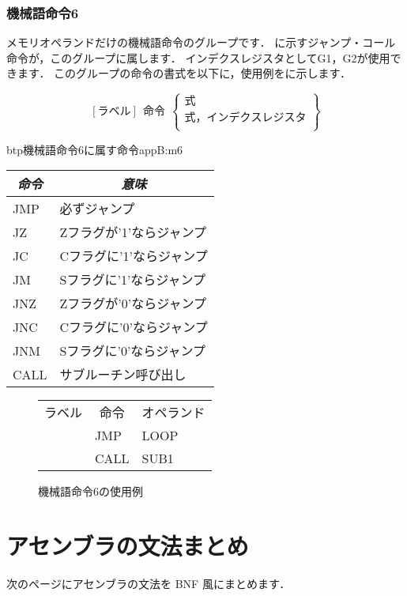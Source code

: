 \subsubsection{機械語命令6}
メモリオペランドだけの機械語命令のグループです．
に示すジャンプ・コール命令が，このグループに属します．
インデクスレジスタとしてG1，G2が使用できます．
このグループの命令の書式を以下に，使用例をに示します．

{\small\[ %
[ラベル]~~命令~~\left\{
  \begin{array}{c}
   式 \\
   式，インデクスレジスタ \\
  \end{array}  
 \right\}
 \]}

\begin{mytable}{btp}{機械語命令6に属す命令}{appB:m6}
{\small\begin{tabular}{l|l}
\hline\hline
\multicolumn{1}{c|}{\it 命令} & \multicolumn{1}{c}{\it 意味} \\
\hline
JMP & 必ずジャンプ \\
JZ  & Zフラグが'1'ならジャンプ \\
JC  & Cフラグに'1'ならジャンプ \\
JM  & Sフラグに'1'ならジャンプ \\
JNZ & Zフラグが'0'ならジャンプ \\
JNC & Cフラグに'0'ならジャンプ \\
JNM & Sフラグに'0'ならジャンプ \\
CALL & サブルーチン呼び出し
\end{tabular}}
\end{mytable}

\begin{figure}[btp]
\begin{center}
{\tt\small\begin{tabular}{|l|l|l|}
\hline
\hline
\multicolumn{1}{|c|}{ラベル} & 
        \multicolumn{1}{c|}{命令} & \multicolumn{1}{c|}{オペランド} \\
  & JMP & LOOP \\
  & CALL & SUB1 \\
\hline
\end{tabular}}
\caption{機械語命令6の使用例}
\label{fig:appB:m6ex}
\end{center}
\end{figure}

\section{アセンブラの文法まとめ}
次のページにアセンブラの文法を BNF 風にまとめます．

